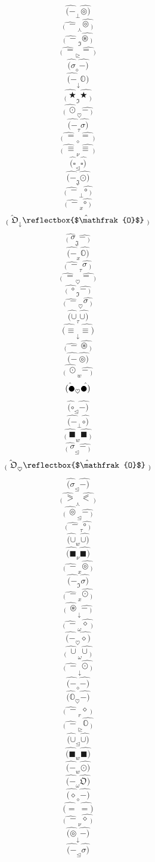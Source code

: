 \documentclass[12pt]{article}
\begin{document}
\begin{multicols}{5}
$$\hat{(-} _\bot \hat{\circledcirc)}$$
$$\hat{_( \ -} _\curlywedge \hat{\circledcirc\ _)}$$
$$\hat{_( \ -} _\mathfrak{I} \hat{\circledast\ _)}$$
$$\hat{_( \ =} _\trianglerighteq \hat{=\ _)}$$
$$\hat{(\sigma} _\diamond \hat{-)}$$
$$\hat{(-} _\downarrow \hat{\mathbb{O})}$$
$$\hat{_( \ \bigstar} _\mathfrak{I} \hat{\bigstar\ _)}$$
$$\hat{_( \ \odot} _\heartsuit \hat{-\ _)}$$
$$\hat{(-} _\tau \hat{\sigma)}$$
$$\hat{_( \ =} _\diamond \hat{=\ _)}$$
$$\hat{_( \ \equiv} _\nu \hat{\equiv\ _)}$$
$$\hat{(\square} _\trianglelefteq \hat{\square)}$$
$$\hat{(-} _\mathfrak{J} \hat{\odot)}$$
$$\hat{_( \ -} _\bot \hat{\circ\ _)}$$
$$\hat{_( \ -} _x \hat{\circ\ _)}$$
$$\hat{_( \ \mathfrak{O}} _\downarrow \hat{\reflectbox{$\mathfrak{O}$}\ _)}$$
$$\hat{_( \ \sigma} _\mathfrak{J} \hat{-\ _)}$$
$$\hat{(-} _x \hat{\mathbb{O})}$$
$$\hat{_( \ -} _\tau \hat{\sigma\ _)}$$
$$\hat{_( \ =} _\heartsuit \hat{=\ _)}$$
$$\hat{_( \ \circ} _\mathfrak{I} \hat{-\ _)}$$
$$\hat{_( \ -} _\heartsuit \hat{\sigma\ _)}$$
$$\hat{(\cup} _\tau \hat{\cup)}$$
$$\hat{(\equiv} _\downarrow \hat{\equiv)}$$
$$\hat{_( \ -} \  \hat{\circledast\ _)}$$
$$\hat{(-} \  \hat{\circledcirc)}$$
$$\hat{_( \ \odot} _w \hat{-\ _)}$$
$$\hat{(\newmoon} _\heartsuit \hat{\newmoon)}$$
$$\hat{(\circ} _\trianglelefteq \hat{-)}$$
$$\hat{(-} _\bot \hat{\circ)}$$
$$\hat{_( \ \blacksquare} _w \hat{\blacksquare\ _)}$$
$$\hat{_( \ \sigma} _\trianglelefteq \hat{-\ _)}$$
$$\hat{_( \ \mathfrak{O}} _\heartsuit \hat{\reflectbox{$\mathfrak{O}$}\ _)}$$
$$\hat{(\sigma} _\trianglelefteq \hat{-)}$$
$$\hat{_( \ \eqslantgtr} _\curlywedge \hat{\eqslantless\ _)}$$
$$\hat{_( \ \circledcirc} _\trianglelefteq \hat{-\ _)}$$
$$\hat{_( \ -} _\tau \hat{\circ\ _)}$$
$$\hat{(\cup} _w \hat{\cup)}$$
$$\hat{(\blacksquare} _\nu \hat{\blacksquare)}$$
$$\hat{_( \ -} _x \hat{\circledcirc\ _)}$$
$$\hat{(-} _\mathfrak{I} \hat{\sigma)}$$
$$\hat{_( \ -} _x \hat{\odot\ _)}$$
$$\hat{_( \ \circledast} _\downarrow \hat{-\ _)}$$
$$\hat{_( \ -} _\omega \hat{\diamond\ _)}$$
$$\hat{(-} _\heartsuit \hat{\diamond)}$$
$$\hat{_( \ \cup} _\omega \hat{\cup\ _)}$$
$$\hat{_( \ -} _\downarrow \hat{\odot\ _)}$$
$$\hat{(-} _\diamond \hat{-)}$$
$$\hat{(\mathbb{O}} _\heartsuit \hat{-)}$$
$$\hat{_( \ -} _r \hat{\diamond\ _)}$$
$$\hat{_( \ -} _\trianglerighteq \hat{\mathbb{O}\ _)}$$
$$\hat{(\cup} _\trianglelefteq \hat{\cup)}$$
$$\hat{(\blacksquare} _w \hat{\blacksquare)}$$
$$\hat{(-} _w \hat{\odot)}$$
$$\hat{(-} _\omega \hat{\mathfrak{O})}$$
$$\hat{(\diamond} _\diamond \hat{-)}$$
$$\hat{(=} \  \hat{=)}$$
$$\hat{_( \ -} _\nu \hat{\diamond\ _)}$$
$$\hat{(\circledcirc} _\downarrow \hat{-)}$$
$$\hat{(-} _\trianglelefteq \hat{\sigma)}$$

\end{multicols}
\end{document}
